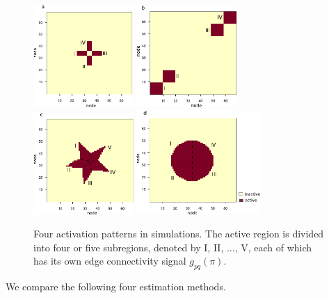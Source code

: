 \documentclass[11pt]{article}
\theoremstyle{plain}
\theoremstyle{definition}
\begin{document}
\begin{figure}[t!]
\centering
\includegraphics[width=3.8cm]{figure/cross.pdf}
\includegraphics[width=3.8cm]{figure/block.pdf}
\includegraphics[width=3.8cm]{figure/star.pdf}
\includegraphics[width=4.7cm]{figure/circle.pdf}
\caption{Four activation patterns in simulations. The active region is divided into four or five subregions, denoted by I, II, ..., V, each of which has its own edge connectivity signal $g_{pq}(\pi)$.}
\label{fig:region}
\end{figure}

We compare the following four estimation methods. 
\end{document}

